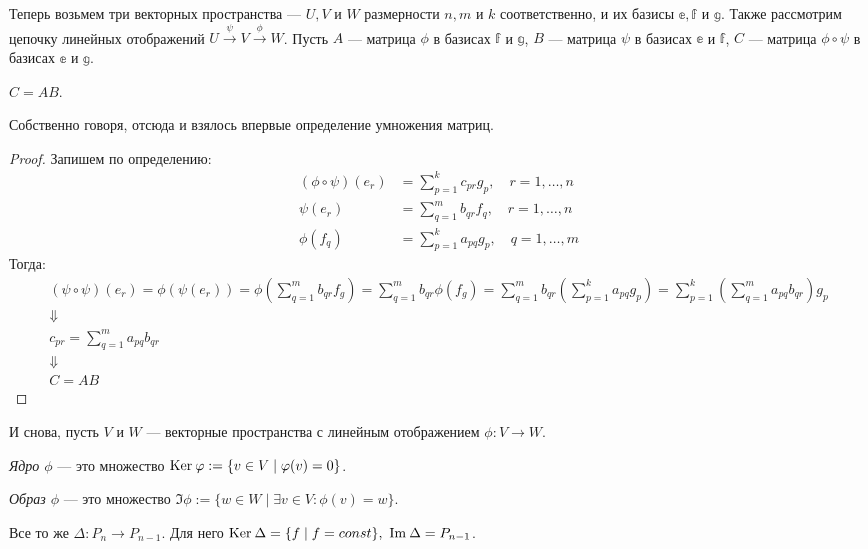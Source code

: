 Теперь возьмем три векторных пространства --- $U, V$ и $W$ размерности $n, m$ и $k$ соответственно, и их базисы $\mathbb{e}, \mathbb{f}$ и $\mathbb{g}$. Также рассмотрим цепочку линейных отображений $U \xrightarrow{\psi} V \xrightarrow{\phi} W$. Пусть $A$ --- матрица $\phi$ в базисах $\mathbb{f}$ и $\mathbb{g}$, $B$ --- матрица $\psi$ в базисах $\mathbb{e}$ и $\mathbb{f}$, $C$ --- матрица $\phi\circ\psi$ в базисах $\mathbb{e}$ и $\mathbb{g}$.

\begin{Suggestion}
$C = AB$.
\end{Suggestion}
\begin{Comment}
Собственно говоря, отсюда и взялось впервые определение умножения матриц.
\end{Comment}
\begin{proof} Запишем по определению:
\begin{align*}
(\phi \circ \psi)(e_r) &= \sum_{p = 1}^{k}c_{pr}g_p, \quad r = 1, \ldots, n \\
\psi(e_r) &= \sum_{q = 1}^{m}b_{qr}f_q, \quad r = 1, \ldots, n \\
\phi(f_q) &= \sum_{p = 1}^{k}a_{pq}g_p, \quad q = 1, \ldots, m
\end{align*}
Тогда:
\begin{gather*}
(\psi\circ\psi)(e_r) = \phi(\psi(e_r)) = \phi\left(\sum_{q = 1}^{m}b_{qr}f_g \right) = \sum_{q = 1}^{m}b_{qr}\phi(f_g) = \sum_{q = 1}^{m}b_{qr}\left(\sum_{p = 1}^{k}a_{pq}g_p \right) = \sum_{p = 1}^{k}\left(\sum_{q = 1}^{m}a_{pq}b_{qr} \right)g_p \\
\Downarrow \\
c_{pr} = \sum_{q = 1}^{m}a_{pq}b_{qr} \\
\Downarrow\\
 C = AB
\end{gather*}
\end{proof}

И снова, пусть $V$ и $W$ --- векторные пространства с линейным отображением $\phi: V \rightarrow W$.

\begin{Def}
\textit{Ядро $\phi$} --- это множество $\mathrm{Ker}\:\varphi := \{v \in V \mid \varphi(v) = 0 \}$.
\end{Def} 
\begin{Def}
\textit{Образ $\phi$} --- это множество $\Im \phi := \{w \in W \mid \exists v \in V : \phi(v) = w \}$.
\end{Def}

\begin{Examples}
Все то же $\Delta: P_n \rightarrow P_{n-1}$. Для него $\mathrm{Ker}\: \Delta = \{f \mid f = const\},\  \mathrm{Im\:} \Delta = P_{n-1}$.
\end{Examples}

